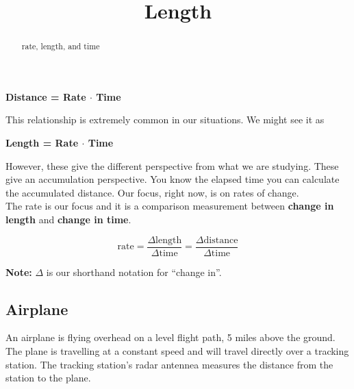 \documentclass{ximera}
\title{Length}
\begin{document}
\begin{abstract}
rate, length, and time
\end{abstract}
\maketitle




\begin{center}
\textbf{\textcolor{purple!85!blue}{Distance = Rate $\cdot$ Time}} 
\end{center}

This relationship is extremely common in our situations.  We might see it as



\begin{center}
\textbf{\textcolor{purple!85!blue}{Length = Rate $\cdot$ Time}} 
\end{center}



However, these give the different perspective from what we are studying.  These give an accumulation perspective. You  know the elapsed time you can calculate the accumulated distance.  Our focus, right now, is on rates of change. \\


The rate is our focus and it is a comparison measurement between \textbf{\textcolor{red!80!black}{change in length}} and \textbf{\textcolor{red!80!black}{change in time}}.



\[
\text{rate} = \frac{\Delta \text{length}}{\Delta \text{time}} = \frac{\Delta \text{distance}}{\Delta \text{time}}
\]

\textbf{Note:} $\Delta$ is our shorthand notation for ``change in''. \\






\subsection*{Airplane}

An airplane is flying overhead on a level flight path, 5 miles above the ground.  The plane is travelling at a constant speed and will travel directly over a tracking station. The tracking station's radar antennea measures the distance from the station to the plane.
\end{document}
